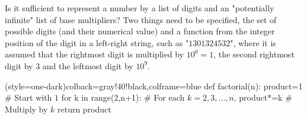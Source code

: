 \documentclass[10pt]{extarticle}
\begin{document}
Is it sufficient to represent a number by a list of digits and an "potentially infinite" list of base multipliers? Two things need to be specified, the set of possible digits (and their numerical value) and a function from the integer position of the digit in a left-right string, such as "$1301324532$", where it is assumed that the rightmost digit is multiplied by $10^0 = 1$, the second rightmost digit by $3$ and the leftmost digit by $10^9$.





\begin{python}(style=one-dark){colback=gray!40!black,colframe=blue}
def factorial(n):
product=1 # Start with $1$
for k in range(2,n+1): # For each $k=2,3,\ldots,n$,
product*=k # Multiply by $k$
return product
\end{python}
\end{document}
